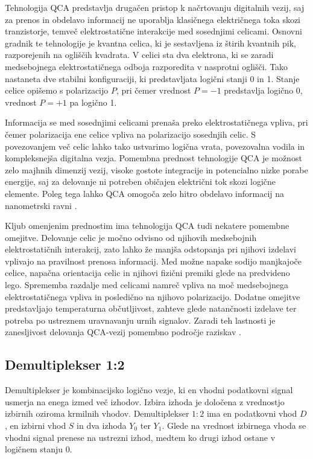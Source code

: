 Tehnologija QCA predstavlja drugačen pristop k načrtovanju digitalnih vezij, saj za prenos in obdelavo informacij ne uporablja klasičnega električnega toka skozi tranzistorje, temveč elektrostatične interakcije med sosednjimi celicami. Osnovni gradnik te tehnologije je kvantna celica, ki je sestavljena iz štirih kvantnih pik, razporejenih na ogliščih kvadrata. V celici sta dva elektrona, ki se zaradi medsebojnega elektrostatičnega odboja razporedita v nasprotni oglišči. Tako nastaneta dve stabilni konfiguraciji, ki predstavljata logični stanji 0 in 1. Stanje celice opišemo s polarizacijo $P$, pri čemer vrednost $P=-1$ predstavlja logično 0, vrednost $P=+1$ pa logično 1.

Informacija se med sosednjimi celicami prenaša preko elektrostatičnega vpliva, pri čemer polarizacija ene celice vpliva na polarizacijo sosednjih celic. S povezovanjem več celic lahko tako ustvarimo logična vrata, povezovalna vodila in kompleksnejša digitalna vezja. Pomembna prednost tehnologije QCA je možnost zelo majhnih dimenzij vezij, visoke gostote integracije in potencialno nizke porabe energije, saj za delovanje ni potreben običajen električni tok skozi logične elemente. Poleg tega lahko QCA omogoča zelo hitro obdelavo informacij na nanometrski ravni \cite{lent1993}.

Kljub omenjenim prednostim ima tehnologija QCA tudi nekatere pomembne omejitve. Delovanje celic je močno odvisno od njihovih medsebojnih elektrostatičnih interakcij, zato lahko že manjša odstopanja pri njihovi izdelavi vplivajo na pravilnost prenosa informacij. Med možne napake sodijo manjkajoče celice, napačna orientacija celic in njihovi fizični premiki glede na predvideno lego. Sprememba razdalje med celicami namreč vpliva na moč medsebojnega elektrostatičnega vpliva in posledično na njihovo polarizacijo. Dodatne omejitve predstavljajo temperaturna občutljivost, zahteve glede natančnosti izdelave ter potreba po ustreznem uravnavanju urnih signalov. Zaradi teh lastnosti je zanesljivost delovanja QCA-vezij pomembno področje raziskav \cite{g27:khan2023}.

\subsection{Demultiplekser 1:2}

Demultiplekser je kombinacijsko logično vezje, ki en vhodni podatkovni signal usmerja na enega izmed več izhodov. Izbira izhoda je določena z vrednostjo izbirnih oziroma krmilnih vhodov. Demultiplekser $1:2$ ima en podatkovni vhod $D$, en izbirni vhod $S$ in dva izhoda $Y_0$ ter $Y_1$. Glede na vrednost izbirnega vhoda se vhodni signal prenese na ustrezni izhod, medtem ko drugi izhod ostane v logičnem stanju 0.

